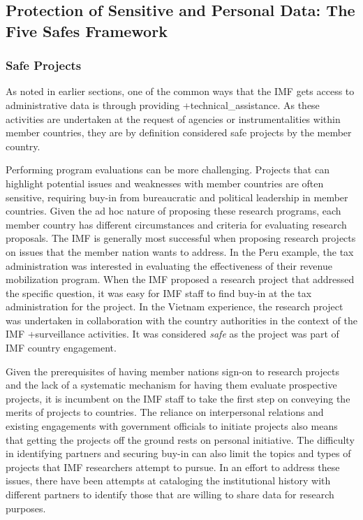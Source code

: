\documentclass[
]{WileySix}
\begin{document}
\hypertarget{protection-of-sensitive-and-personal-data-the-five-safes-framework-8}{%
\subsection{Protection of Sensitive and Personal Data: The Five Safes Framework}\label{protection-of-sensitive-and-personal-data-the-five-safes-framework-8}}

\hypertarget{safe-projects-8}{%
\subsubsection{Safe Projects}\label{safe-projects-8}}

As noted in earlier sections, one of the common ways that the IMF gets access to administrative data is through providing +technical\_assistance\textbar. As these activities are undertaken at the request of agencies or instrumentalities within member countries, they are by definition considered safe projects by the member country.

Performing program evaluations can be more challenging. Projects that can highlight potential issues and weaknesses with member countries are often sensitive, requiring buy-in from bureaucratic and political leadership in member countries. Given the ad hoc nature of proposing these research programs, each member country has different circumstances and criteria for evaluating research proposals. The IMF is generally most successful when proposing research projects on issues that the member nation wants to address. In the Peru example, the tax administration was interested in evaluating the effectiveness of their revenue mobilization program. When the IMF proposed a research project that addressed the specific question, it was easy for IMF staff to find buy-in at the tax administration for the project. In the Vietnam experience, the research project was undertaken in collaboration with the country authorities in the context of the IMF +surveillance\textbar{} activities. It was considered \emph{safe} as the project was part of IMF country engagement.

Given the prerequisites of having member nations sign-on to research projects and the lack of a systematic mechanism for having them evaluate prospective projects, it is incumbent on the IMF staff to take the first step on conveying the merits of projects to countries. The reliance on interpersonal relations and existing engagements with government officials to initiate projects also means that getting the projects off the ground rests on personal initiative. The difficulty in identifying partners and securing buy-in can also limit the topics and types of projects that IMF researchers attempt to pursue. In an effort to address these issues, there have been attempts at cataloging the institutional history with different partners to identify those that are willing to share data for research purposes.
\end{document}
